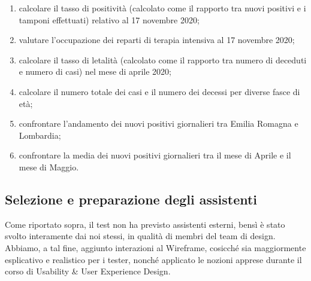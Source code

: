 \begin{enumerate}
    \item calcolare il tasso di positività (calcolato come il rapporto tra nuovi positivi e i tamponi effettuati) relativo al 17 novembre 2020;
    \item valutare l'occupazione dei reparti di terapia intensiva al 17 novembre 2020;
    \item calcolare il tasso di letalità (calcolato come il rapporto tra numero di deceduti e numero di casi) nel mese di aprile 2020;
    \item calcolare il numero totale dei casi e il numero dei decessi per diverse fasce di età;
    \item confrontare l'andamento dei nuovi positivi giornalieri tra Emilia Romagna e Lombardia;
    \item confrontare la media dei nuovi positivi giornalieri tra il mese di Aprile e il mese di Maggio.
\end{enumerate}

\subsection{Selezione e preparazione degli assistenti}
\label{ss:vd-selezione-preparazione-assistenti}
Come riportato sopra, il test non ha previsto assistenti esterni, bensì è stato svolto interamente dai noi stessi, in qualità di membri del team di design. Abbiamo, a tal fine, aggiunto interazioni al Wireframe, cosicché sia maggiormente esplicativo e realistico per i tester, nonché applicato le nozioni apprese durante il corso di Usability \& User Experience Design.

